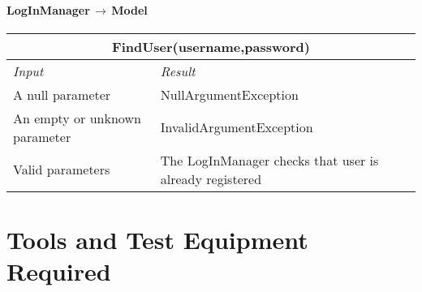 \documentclass[11pt,a4paper]{report}
\begin{document}
\subsubsection{LogInManager$\,\to\,$Model}
\begin{tabularx}{\textwidth}{|X|X|}
	\hline
	\multicolumn{2}{|c|}{\textbf{FindUser(username,password)}}\\
	\hline
	\textit{Input} & \textit{Result}\\
	\hline
	A null parameter & NullArgumentException\\
	\hline
	An empty or unknown parameter & InvalidArgumentException\\
	\hline
	Valid parameters & The LogInManager checks that user is already registered\\
	\hline
\end{tabularx}
\chapter[{Tools and Test Equipment Required}]{Tools and Test Equipment\\Required}
\end{document}
